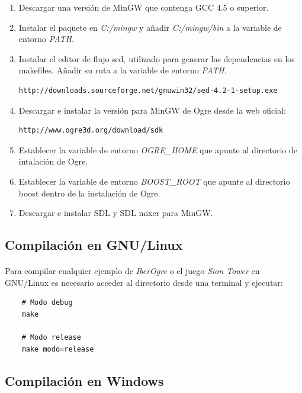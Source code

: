 \documentclass[16pt,spanish]{article}
\def \juego{\emph {Sion Tower} }
\def \wiki{\emph{IberOgre} }
\begin{document}
\begin{enumerate}
    \item Descargar una versión de MinGW que contenga GCC 4.5 o superior.
    \item Instalar el paquete en \emph{C:/mingw} y añadir \emph{C:/mingw/bin}
    a la variable de entorno \emph{PATH}.
    \item Instalar el editor de flujo sed, utilizado para generar las dependencias
    en los makefiles. Añadir su ruta a la variable de entorno \emph{PATH}.
    \begin{verbatim}
http://downloads.sourceforge.net/gnuwin32/sed-4.2-1-setup.exe
    \end{verbatim}
    \item Descargar e instalar la versión para MinGW de Ogre desde la web oficial:
    \begin{verbatim}
http://www.ogre3d.org/download/sdk
    \end{verbatim}
    \item Establecer la variable de entorno \emph{OGRE\_HOME} que apunte
    al directorio de intalación de Ogre.
    \item Establecer la variable de entorno \emph{BOOST\_ROOT} que apunte
    al directorio boost dentro de la instalación de Ogre.
    \item Descargar e instalar SDL y SDL mixer para MinGW.
\end{enumerate}

\subsection{Compilación en GNU/Linux}

\paragraph{}
Para compilar cualquier ejemplo de \wiki o el juego \juego en GNU/Linux 
es necesario acceder al directorio desde una terminal y ejecutar:

\begin{verbatim}
    # Modo debug
    make
    
    # Modo release
    make modo=release
\end{verbatim}

\subsection{Compilación en Windows}
\end{document}
